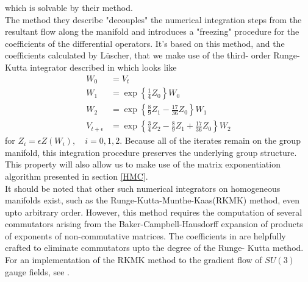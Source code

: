 \documentclass[a4paper,10pt]{book}
\begin{document}
which is solvable by their method.\\The method they describe "decouples" the numerical integration steps from the resultant flow along the manifold and introduces a "freezing" procedure for the coefficients of the differential operators. It's based on this method, and the coefficients calculated by Lüscher, that we make use of the third- order Runge-Kutta integrator described in \cite{Luscher2010} which looks like
\begin{equation}
\begin{aligned}
W_{0} &=V_{t} \\
W_{1} &=\exp \left\{\frac{1}{4} Z_{0}\right\} W_{0} \\
W_{2} &=\exp \left\{\frac{8}{9} Z_{1}-\frac{17}{36} Z_{0}\right\} W_{1} \\
V_{t+\epsilon} &=\exp \left\{\frac{3}{4} Z_{2}-\frac{8}{9} Z_{1}+\frac{17}{36} Z_{0}\right\} W_{2}
\end{aligned}
\end{equation}
for $Z_{i}=\epsilon Z\left(W_{i}\right), \quad i=0,1,2$.
Because all of the iterates remain on the group manifold, this integration procedure preserves the underlying group structure. This property will also allow us to make use of the matrix exponentiation algorithm presented in section \ref{HMC}.\\It should be noted that other such numerical integrators on homogeneous manifolds exist, such as the Runge-Kutta-Munthe-Kaas(RKMK) method, even upto arbitrary order. However, this method requires the computation of several commutators arising from the Baker-Campbell-Hausdorff expansion of products of exponents of non-commutative matrices. The coefficients in \cite{Luscher2010} are helpfully crafted to eliminate commutators upto the degree of the Runge- Kutta method. For an implementation of the RKMK method to the gradient flow of $SU(3)$ gauge fields, see \cite{non_gaussianities2015}.
\end{document}

